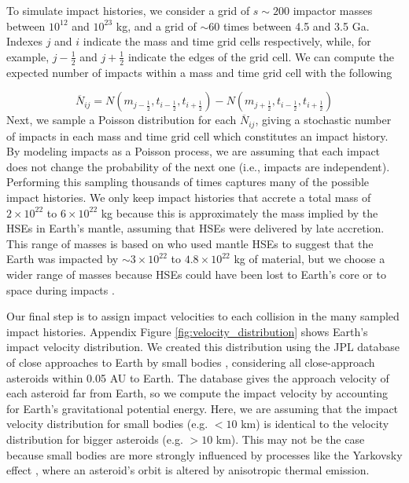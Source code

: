 \documentclass{aastex631}
\begin{document}
To simulate impact histories, we consider a grid of $s\sim 200$ impactor masses between $10^{12}$ and $10^{23}$ kg, and a grid of $\sim 60$ times between 4.5 and 3.5 Ga. Indexes $j$ and $i$ indicate the mass and time grid cells respectively, while, for example, $j-\frac{1}{2}$ and $j+\frac{1}{2}$ indicate the edges of the grid cell. We can compute the expected number of impacts within a mass and time grid cell with the following

\begin{equation}
  \overline{N}_{ij} = N(m_{j-\frac{1}{2}},t_{i-\frac{1}{2}},t_{i+\frac{1}{2}}) - N(m_{j+\frac{1}{2}},t_{i-\frac{1}{2}},t_{i+\frac{1}{2}})
\end{equation}
Next, we sample a Poisson distribution for each $\overline{N}_{ij}$, giving a stochastic number of impacts in each mass and time grid cell which constitutes an impact history. By modeling impacts as a Poisson process, we are assuming that each impact does not change the probability of the next one (i.e., impacts are independent). Performing this sampling thousands of times captures many of the possible impact histories. We only keep impact histories that accrete a total mass of $2 \times 10^{22}$ to $6 \times 10^{22}$ kg because this is approximately the mass implied by the HSEs in Earth's mantle, assuming that HSEs were delivered by late accretion. This range of masses is based on \citet{Day_2015} who used mantle HSEs to suggest that the Earth was impacted by $\sim 3 \times 10^{22}$ to $4.8 \times 10^{22}$ kg of material, but we choose a wider range of masses because HSEs could have been lost to Earth's core or to space during impacts \citep{Marchi_2018}.

Our final step is to assign impact velocities to each collision in the many sampled impact histories. Appendix Figure \ref{fig:velocity_distribution} shows Earth's impact velocity distribution. We created this distribution using the JPL database of close approaches to Earth by small bodies \citep{Park_2023}, considering all close-approach asteroids within 0.05 AU to Earth. The database gives the approach velocity of each asteroid far from Earth, so we compute the impact velocity by accounting for Earth's gravitational potential energy. Here, we are assuming that the impact velocity distribution for small bodies (e.g. $< 10$ km) is identical to the velocity distribution for bigger asteroids (e.g. $> 10$ km). This may not be the case because small bodies are more strongly influenced by processes like the Yarkovsky effect \citep{Bottke_2006}, where an asteroid's orbit is altered by anisotropic thermal emission.
\end{document}
